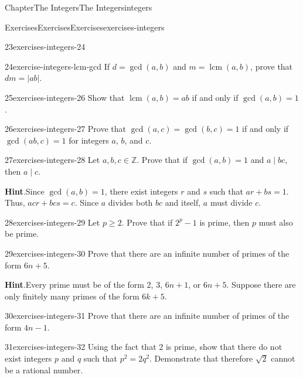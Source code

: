 \documentclass[oneside,10pt,]{book}
\newcommand{\blocktitlefont}{\relax}
\numberwithin{equation}{section}
\newcommand{\lcm}{\operatorname{lcm}}
\begin{document}
\begin{chapterptx}{Chapter}{The Integers}{}{The Integers}{}{}{integers}
\begin{exercises-section}{Exercises}{Exercises}{}{Exercises}{}{}{exercises-integers}
\begin{divisionexercise}{23}{}{}{exercises-integers-24}
\end{divisionexercise}%
\begin{divisionexercise}{24}{}{}{exercise-integers-lcm-gcd}%
If \(d= \gcd(a, b)\) and \(m = \lcm(a, b)\), prove that \(dm = |ab|\).%
\end{divisionexercise}%
\begin{divisionexercise}{25}{}{}{exercises-integers-26}%
Show that \(\lcm(a,b) = ab\) if and only if \(\gcd(a,b) = 1\).%
\end{divisionexercise}%
\begin{divisionexercise}{26}{}{}{exercises-integers-27}%
Prove that \(\gcd(a,c) = \gcd(b,c) =1\) if and only if \(\gcd(ab,c) = 1\) for integers \(a\), \(b\), and \(c\).%
\end{divisionexercise}%
\begin{divisionexercise}{27}{}{}{exercises-integers-28}%
Let \(a, b, c \in {\mathbb Z}\).  Prove that if \(\gcd(a,b) = 1\) and \(a  \mid bc\), then \(a  \mid  c\).%
\par\smallskip%
\noindent\textbf{\blocktitlefont Hint}.\hypertarget{exercises-integers-28-2}{}\quad{}Since \(\gcd(a,b) = 1\), there exist integers \(r\) and \(s\) such that \(ar + bs = 1\).   Thus, \(acr + bcs = c\). Since \(a\) divides both \(bc\) and itself, \(a\) must divide \(c\).%
\end{divisionexercise}%
\begin{divisionexercise}{28}{}{}{exercises-integers-29}%
Let \(p \geq 2\).  Prove that if \(2^p - 1\) is prime, then \(p\) must also be prime.%
\end{divisionexercise}%
\begin{divisionexercise}{29}{}{}{exercises-integers-30}%
Prove that there are an infinite number of primes of the form \(6n + 5\).%
\par\smallskip%
\noindent\textbf{\blocktitlefont Hint}.\hypertarget{exercises-integers-30-2}{}\quad{}Every prime must be of the form 2, 3, \(6n + 1\), or \(6n + 5\).   Suppose there are only finitely many primes of the form \(6k + 5\).%
\end{divisionexercise}%
\begin{divisionexercise}{30}{}{}{exercises-integers-31}%
Prove that there are an infinite number of primes of the form \(4n - 1\).%
\end{divisionexercise}%
\begin{divisionexercise}{31}{}{}{exercises-integers-32}%
Using the fact that 2 is prime, show that there do not exist integers \(p\) and \(q\) such that \(p^2 = 2 q^2\). Demonstrate that therefore \(\sqrt{2}\) cannot be a rational number.%

\end{divisionexercise}
\end{exercises-section}
\end{chapterptx}
\end{document}
